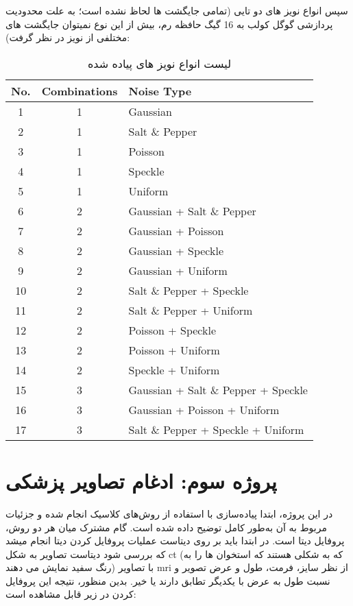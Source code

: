 \documentclass[a4paper,12pt]{article}
\begin{document}
سپس انواع نویز های دو تایی (تمامی جایگشت ها لحاظ نشده است؛ به علت محدودیت پردازشی گوگل کولب به 16 گیگ حافظه رم، بیش از این نوع نمیتوان جایگشت های مختلفی از نویز در نظر گرفت):

\pagebreak

\begin{table}[h]
	\centering
	\begin{latin}
	\begin{tabular}{|c|c|l|}
		\hline
		\textbf{No.} & \textbf{Combinations} & \textbf{Noise Type} \\
		\hline
		1 & 1 & Gaussian \\
		\hline
		2 & 1 & Salt \& Pepper \\
		\hline
		3 & 1 & Poisson \\
		\hline
		4 & 1 & Speckle \\
		\hline
		5 & 1 & Uniform \\
		\hline
		6 & 2 & Gaussian + Salt \& Pepper \\
		\hline
		7 & 2 & Gaussian + Poisson \\
		\hline
		8 & 2 & Gaussian + Speckle \\
		\hline
		9 & 2 & Gaussian + Uniform \\
		\hline
		10 & 2 & Salt \& Pepper + Speckle \\
		\hline
		11 & 2 & Salt \& Pepper + Uniform \\
		\hline
		12 & 2 & Poisson + Speckle \\
		\hline
		13 & 2 & Poisson + Uniform \\
		\hline
		14 & 2 & Speckle + Uniform \\
		\hline
		15 & 3 & Gaussian + Salt \& Pepper + Speckle \\
		\hline
		16 & 3 & Gaussian + Poisson + Uniform \\
		\hline
		17 & 3 & Salt \& Pepper + Speckle + Uniform \\
		\hline
	\end{tabular}
	\end{latin}
	\caption{لیست انواع نویز های پیاده شده}
\end{table}
	

\pagebreak


\section{پروژه سوم: ادغام تصاویر پزشکی}
در این پروژه، ابتدا پیاده‌سازی با استفاده از روش‌های کلاسیک انجام شده و جزئیات مربوط به آن به‌طور کامل توضیح داده شده است. گام مشترک میان هر دو روش، پروفایل دیتا است.
در ابتدا باید بر روی دیتاست عملیات پروفایل کردن دیتا انجام میشد که بررسی شود دیتاست تصاویر به شکل ct (که به شکلی هستند که استخوان ها را به رنگ سفید نمایش می دهند) با تصاویر mri از نظر سایز، فرمت، طول و عرض تصویر و نسبت طول به عرض با یکدیگر تطابق دارند یا خیر. بدین منظور، نتیجه این پروفایل کردن در زیر قابل مشاهده است:
\end{document}
